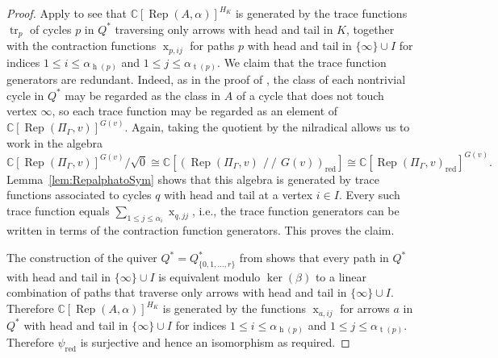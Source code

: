 \documentclass[11pt,reqno]{amsart}
\numberwithin{equation}{section}
\theoremstyle{definition}
\newcommand{\CC}{\ensuremath{\mathbb{C}}}
\newcommand{\git}{\ensuremath{\operatorname{\!/\!\!/\!}}}
\newcommand{\head}{\operatorname{h}}
\newcommand{\Rep}{\operatorname{Rep}}
\newcommand{\tail}{\operatorname{t}}
\newcommand{\tr}{\operatorname{tr}}
\newcommand{\xpij}[2]{\operatorname{x}_{#1,#2}}
\begin{document}
\begin{proof}
Apply \cite[Proposition~3.2]{CY23} to see that $\CC[\Rep(A,\alpha)]^{H_K}$ is generated by the trace functions $\tr_p$ of cycles $p$ in $Q^*$ traversing only arrows with head and tail in $K$, together with the contraction functions $\xpij{p}{ij}$ for paths $p$ with head and tail in $\{\infty\}\cup I$ for indices  $1\leq i\leq \alpha_{\head(p)}$ and $1\leq j\leq \alpha_{\tail(p)}$. We claim that the trace function generators are redundant. Indeed, as in the proof of \cite[Proposition~4.5]{CY23}, the class of each nontrivial cycle in $Q^*$ may be regarded as the class in $A$ of a cycle that does not touch vertex $\infty$, so each trace function may be regarded as an element of $\CC[\Rep(\Pi_\Gamma,v)]^{G(v)}$. Again, taking the quotient by the nilradical allows us to 
work in the algebra 
\[
\CC[\Rep(\Pi_\Gamma,v)]^{G(v)}/\sqrt{0}\cong \CC[(\Rep(\Pi_\Gamma,v)\git G(v))_{\mathrm{red}}]\cong \CC[\Rep(\Pi_\Gamma,v)_{\mathrm{red}}]^{G(v)}.
\]
Lemma~\ref{lem:RepalphatoSym} shows that this algebra is generated by trace functions associated to cycles $q$ with head and tail at a vertex $i\in I$. Every such trace function equals $\sum_{1\leq j\leq \alpha_i} \xpij{q}{jj}$, i.e., the trace function generators can be written in terms of the contraction function generators. This proves the claim. 

The construction of the quiver $Q^*= Q_{\{0,1,\dots,r\}}^*$ from \cite[Proposition~3.2]{CGGS1} shows that every path in $Q^*$ with head and tail in $\{\infty\}\cup I$ is equivalent modulo $\ker(\beta)$ to a linear combination of paths that traverse only arrows with head and tail in $\{\infty\}\cup I$. Therefore $\CC[\Rep(A,\alpha)]^{H_K}$ is generated by the functions $\xpij{a}{ij}$ for arrows $a$ in $Q^*$ with head and tail in $\{\infty\}\cup I$ for indices  $1\leq i\leq \alpha_{\head(p)}$ and $1\leq j\leq \alpha_{\tail(p)}$. Therefore $\psi_{\mathrm{red}}$ is surjective and hence an isomorphism as required.
\end{proof}
  
\end{document}
